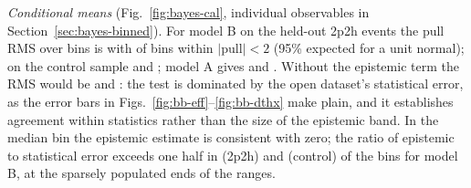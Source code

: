 \documentclass[11pt]{article}
\begin{document}
\emph{Conditional means} (Fig.~\ref{fig:bayes-cal}, individual observables in Section~\ref{sec:bayes-binned}).
For model B on the held-out 2p2h events the pull RMS over \nBayBOODBins{} bins is \nBayBOODPullRMS{} with
\nBayBOODWithin{} of bins within $|$pull$| < 2$ (95\% expected for a unit normal); on the control sample
\nBayBCtlPullRMS{} and \nBayBCtlWithin{}; model A gives \nBayAOODPullRMS{} and \nBayACtlPullRMS{}. Without the
epistemic term the RMS would be \nBayBOODPullRMSnoEpi{} and \nBayBCtlPullRMSnoEpi{}: the test is dominated by the
open dataset's statistical error, as the error bars in Figs.~\ref{fig:bb-eff}--\ref{fig:bb-dthx} make plain, and
it establishes agreement within statistics rather than the size of the epistemic band. In the median bin the
epistemic estimate is consistent with zero; the ratio of epistemic to statistical error exceeds one half in
\nBayBOODEpiStatFracHalf{} (2p2h) and \nBayBCtlEpiStatFracHalf{} (control) of the bins for model B, at the
sparsely populated ends of the ranges.
\end{document}
